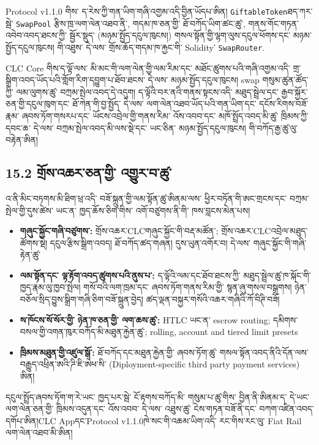 \documentclass[11pt]{article}
\begin{document}
Protocol v1.1.0 གིས་ ད་རེས་ཀྱི་གན་ཡིག་གཞི་འགྱམ་འདི་བྱིན་ཡོདཔ་ཨིན། \texttt{GiftableToken}ཐད་ཀར་སྦེ་ \texttt{SwapPool} རྩིས་ཁྲ་ལག་ལེན་འཐབ་ནི་, གདམ་ཁ་ཅན་གྱི་ ཐོ་བཀོད་ཡིག་ཚང་ཚུ་, གནས་གོང་གཏན་འབེབ་འབད་ཐངས་ཀྱི་ སྦྱོར་སྡུད་ (མཉམ་སྤྱོད་དངུལ་ཁུངས།) གསལ་སྟོན་གྱི་ལྷག་ལུས་དངུལ་ཕོགས་དང་ མཉམ་སྤྱོད་དངུལ་ཁུངས། གི་འཐུས་ དེ་ལས་ གྲོས་ཆོད་གདམ་ཁ་རྐྱང་གི་ Solidity་ \texttt{SwapRouter}.

CLC Core གིས་ད་ལྟོ་ལས་ མི་མང་གི་ལག་ལེན་གྱི་ལམ་རིམ་དང་ མཐོང་ཚུགས་པའི་གཞི་འགྱམ་འདི་ གྲ་སྒྲིག་འབད་ཡོད་པའི་གློག་རིག་དབྱུག་པ་ཐོབ་ཐངས་ དེ་ལས་ མཉམ་སྤྱོད་དངུལ་ཁུངས། swap གསུམ་ཚུན་ཚོད་ཀྱི་ ལམ་ལུགས་ཚུ་ བཀྲམ་སྤེལ་འབད་དེ་འདུག། ད་ལྟོའི་བར་ནའི་གནས་སྟངས་འདི་ མཐུད་སྦྲེལ་དང་ རྒྱབ་སྐྱོར་ཅན་གྱི་དངུལ་ཁུག་དང་ ཐོ་ཀེན་གི་བྱ་སྤྱོད་ དེ་ལས་ ལག་ལེན་འཐབ་ཡོད་པའི་གན་ཡིག་དང་ དངོས་རིགས་བཟོ་རྣམ་ ཞབས་ཏོག་གསརཔ་དང་ ཡོངས་འབྲེལ་གྱི་གནས་རིམ་ འོས་འབབ་དང་ མཁོ་སྤྲོད་འབད་མི་ཚུ་ ཁྲིམས་ཀྱི་དབང་ཆ་ དེ་ལས་ བཀྲམ་སྤེལ་འབད་མི་ལས་སྡེ་དང་ ཡང་ཅིན་ མཉམ་སྤྱོད་དངུལ་ཁུངས། གི་བཀོད་རྒྱ་ཚུ་ལུ་བརྟེན་ཨིན།

\subsection*{15.2 གྲོས་འཆར་ཅན་གྱི་ འགྱུར་བ་ཚུ་}

འ་ནི་མིང་བཏགས་མི་ཐིག་ཕྲ་འདི་ བཟོ་སྐྲུན་གྱི་ལམ་སྟོན་ཚུ་ཨིནམ་ལས་ ཕྱིར་བཏོན་གི་ཨང་གྲངས་དང་ བཀྲམ་སྤེལ་གྱི་དུས་ཚེས་ ཡང་ན་ ཁྱད་ཆོས་ཅིག་གིས་ འགོ་བཙུགས་ནི་གི་ ཁས་བླངས་མེན་པས།

\begin{itemize}[leftmargin=*]
\item \textbf{གཞུང་སྐྱོང་གཞི་བཙུགས་:} གྲོས་འཆར་CLCགཞུང་སྐྱོང་གི་བརྡ་མཚོན་; གྲོས་འཆར་CLCའབྲེལ་མཐུད་ཚོགས་སྡེ། དངུལ་རྩིས་སྒྲིག་འབད། ཐོ་བཀོད་ཚད་གཞན། དུས་ཡུན་འགོར་བ། དེ་ལས་ གཞུང་སྐྱོང་གི་གཞི་རྟེན་ཚུ་
\item \textbf{ལམ་སྟོན་དང་ ལྟ་རྟོག་འབད་ཚུགས་པའི་ནུས་པ་:} ད་ལྟོའི་ལམ་དང་ཐོབ་ཐངས་ཀྱི་ མཐུད་སྦྲེལ་ཚུ་ཁ་སྐོང་གི་ཁྱད་རྣམ་ལུ་ཁྱབ་སྤེལ། གསོ་བའི་ལག་ཁྲམ་དང་ ཞབས་ཏོག་གནས་རིམ་གྱི་ སྙན་ཞུ་གསལ་བསྒྲགས། ཉེན་བཅོལ་སྲིད་བྱུས་སྒྲིག་གཞི་ཅིག་བཟོ་སྐྲུན་བྱེད། ཚད་ལྡན་བསྐྱར་གསོའི་འཆར་གཞིའི་ཀོ་བིཊི་བཟོ།
\item \textbf{ས་ཁོངས་སོ་སོར་གྱི་ ཉེན་ཁ་ཅན་གྱི་ ལག་ཆས་ཚུ་:} HTLC ཡང་ན་ escrow routing; དམིགས་བསལ་གྱི་འགན་ཁུར་བཀོད་མི་མཐུན་རྐྱེན་ཚུ་; rolling, account and tiered limit presets
\item \textbf{ཁྲིམས་མཐུན་གྱི་འཛུལ་སྒོ་:} ཐོ་བཀོད་དང་མཐུན་རྐྱེན་གྱི་ ཞབས་ཏོག་ཚུ་ གསལ་སྟོན་འབད་ནིའི་དོན་ལས་ བརྒྱུད་འཕྲིན་ཨའི་ཌི་ཇི་ཨེཕ་སི་ (Diployment-specific third party payment services) ཨིན།
\end{itemize}
དངུལ་སྤྲོད་ཞབས་ཏོག་ག་རེ་ཡང་ ཁྱད་པར་སྦེ་ ངོ་རྟགས་བཀོད་མི་ གསུམ་པ་ཚུ་གིས་ བྱིན་ནི་ཨིནམ་ད་ དེ་ཡང་ ལག་ལེན་ཅན་གྱི་ ཁྲིམས་འདུན་དང་ འོས་འབབ་ དེ་ལས་ འཐུས་ཚུ་ ངེས་གཏན་བཟོ་ནི་དང་ བཀག་འཛིན་འབད་དགོཔ་ཨིན།CLC Appདང་Protocol v1.1.0ཁེ་སང་གི་འཆམ་ཡིག་འདི་ རང་གིས་རང་ལུ་ Fiat Rail ལག་ལེན་འཐབ་མི་ཨིན།
\end{document}
